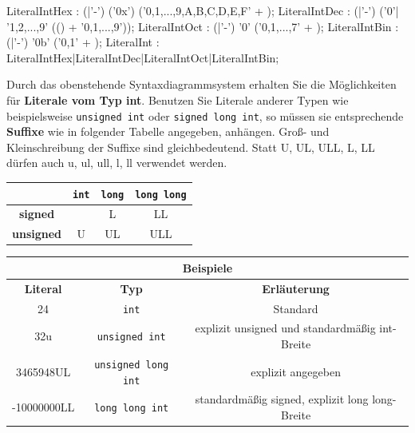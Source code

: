 \documentclass[a4paper]{report}
\begin{document}
\begin{center}
\begin{mdframed}[rightmargin=70pt, leftmargin=70pt, linewidth= 0pt]

\begin{rail}
	LiteralIntHex : (|'-') ('0x') ('0,1,...,9,A,B,C,D,E,F' +  );
	LiteralIntDec : (|'-') ('0'| '1,2,...,9' (() + '0,1,...,9'));
	LiteralIntOct : (|'-') '0' ('0,1,...,7' +  );
	LiteralIntBin : (|'-') '0b' ('0,1' +  );
	LiteralInt    : LiteralIntHex|LiteralIntDec|LiteralIntOct|LiteralIntBin;
\end{rail}
\end{mdframed}
\end{center}

Durch das obenstehende Syntaxdiagrammsystem erhalten Sie die Möglichkeiten für \textbf{Literale vom Typ int}. Benutzen Sie Literale anderer Typen wie beispielsweise \texttt{unsigned int} oder \texttt{signed long int}, so müssen sie entsprechende \textbf{Suffixe} wie in folgender Tabelle angegeben, anhängen. Groß- und Kleinschreibung der Suffixe sind gleichbedeutend. Statt U, UL, ULL, L, LL dürfen auch u, ul, ull, l, ll verwendet werden.

\begin{center}
\begin{tabular}{|c|ccc|}
	\hline
	& 					\texttt{int} &		\texttt{long} &		\texttt{long long} \\ \hline
	\textbf{signed} &	&					L &					LL \\
	\textbf{unsigned}&	U &					UL &				ULL \\ \hline
\end{tabular}
\end{center}

\begin{center}
	\begin{tabular}{|c|c|c|} \hline
		\multicolumn{3}{|c|}{Beispiele} \\ \hline
		\textbf{Literal} & \textbf{Typ} & \textbf{Erläuterung} \\ \hline
		24 & \texttt{int} & Standard \\
		32u & \texttt{unsigned int} & explizit unsigned und standardmäßig int-Breite \\
		3465948UL & \texttt{unsigned long int} & explizit angegeben \\
		-10000000LL & \texttt{long long int} & standardmäßig signed, explizit long long-Breite \\ \hline
	\end{tabular}
\end{center}
\end{document}
